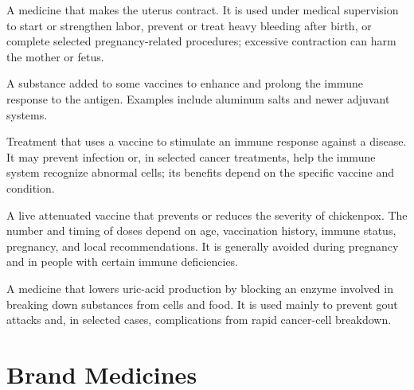  A medicine that makes the uterus contract. It is used under medical supervision to start or strengthen labor, prevent or treat heavy bleeding after birth, or complete selected pregnancy-related procedures; excessive contraction can harm the mother or fetus.

 A substance added to some vaccines to enhance and prolong the immune response to the antigen. Examples include aluminum salts and newer adjuvant systems.



 Treatment that uses a vaccine to stimulate an immune response against a disease. It may prevent infection or, in selected cancer treatments, help the immune system recognize abnormal cells; its benefits depend on the specific vaccine and condition.

 A live attenuated vaccine that prevents or reduces the severity of chickenpox. The number and timing of doses
depend on age, vaccination history, immune status, pregnancy, and local recommendations.
It is generally avoided during pregnancy and in people with certain immune deficiencies.



 A medicine that lowers uric-acid production by blocking an enzyme involved in breaking down substances from cells and food. It is used mainly to prevent gout attacks and, in selected cases, complications from rapid cancer-cell breakdown.

\section*{Brand Medicines}
